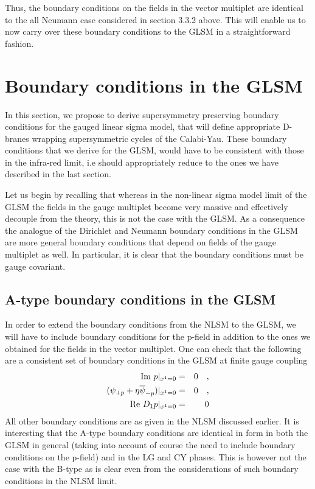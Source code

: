 \documentclass[a4paper,12pt]{article}
\begin{document}
Thus, the boundary conditions on the fields in the vector multiplet 
are identical to the all Neumann case considered in section 3.3.2 above.
This will enable us to now carry over these boundary conditions to the
GLSM in a straightforward fashion.


\section{Boundary conditions in the GLSM}


In this section, we propose to derive supersymmetry preserving
boundary conditions for the gauged linear sigma model, that will
define appropriate D-branes wrapping supersymmetric cycles of
the Calabi-Yau. These boundary conditions that we derive for the GLSM, 
would have to be consistent with those in the infra-red limit, i.e 
should appropriately reduce to the ones we have described in the last
section. 

Let us begin by recalling that whereas in the 
non-linear sigma model limit of the GLSM 
the fields in the gauge multiplet become very massive and
effectively decouple from the theory, this is not the case
with the GLSM. As a consequence the analogue of the 
Dirichlet and Neumann boundary conditions in the GLSM are more 
general boundary conditions that depend on fields of the gauge multiplet 
as well. In particular, it is clear that the boundary conditions must
be gauge covariant. 

\subsection{A-type boundary conditions in the GLSM}

In order to extend the boundary conditions from the NLSM
to the GLSM, we
will have to include boundary conditions for the p-field in addition
to the ones we obtained for the
fields in the vector multiplet. One can check that the following  are a
consistent set of boundary conditions in the GLSM at finite gauge
coupling
\begin{eqnarray}
{\rm Im}\ p|_{x^1=0} &=& 0\quad, \\
(\psi_{+p} + \eta \overline{\psi}_{-p})|_{x^1=0}&=&0\quad, \\
{\rm Re}\ D_1  p|_{x^1=0} &=& 0
\end{eqnarray}
All other boundary conditions are as given in the NLSM discussed
earlier. It is interesting that the A-type boundary conditions are
identical in form in both the GLSM in general (taking into account of
course the need to include boundary conditions on the p-field)
and in the LG and CY phases. This is however not the case with the B-type
as is clear even from the considerations of such
boundary conditions in the NLSM limit. 
\end{document}
